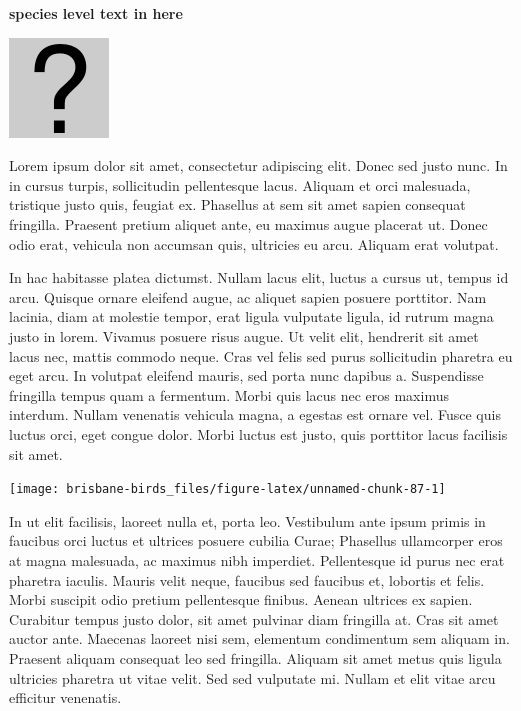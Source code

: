 \documentclass[]{book}
\let\origfigure\figure
\let\endorigfigure\endfigure
\renewenvironment{figure}[1][2] {
  \expandafter\origfigure\expandafter[H]
} {
  \endorigfigure
}
\begin{document}
\textbf{species level text in here}

\begin{figure}
\centering
\includegraphics{assets/missing.png}
\caption{No image for species}
\end{figure}

Lorem ipsum dolor sit amet, consectetur adipiscing elit. Donec sed justo
nunc. In in cursus turpis, sollicitudin pellentesque lacus. Aliquam et
orci malesuada, tristique justo quis, feugiat ex. Phasellus at sem sit
amet sapien consequat fringilla. Praesent pretium aliquet ante, eu
maximus augue placerat ut. Donec odio erat, vehicula non accumsan quis,
ultricies eu arcu. Aliquam erat volutpat.

In hac habitasse platea dictumst. Nullam lacus elit, luctus a cursus ut,
tempus id arcu. Quisque ornare eleifend augue, ac aliquet sapien posuere
porttitor. Nam lacinia, diam at molestie tempor, erat ligula vulputate
ligula, id rutrum magna justo in lorem. Vivamus posuere risus augue. Ut
velit elit, hendrerit sit amet lacus nec, mattis commodo neque. Cras vel
felis sed purus sollicitudin pharetra eu eget arcu. In volutpat eleifend
mauris, sed porta nunc dapibus a. Suspendisse fringilla tempus quam a
fermentum. Morbi quis lacus nec eros maximus interdum. Nullam venenatis
vehicula magna, a egestas est ornare vel. Fusce quis luctus orci, eget
congue dolor. Morbi luctus est justo, quis porttitor lacus facilisis sit
amet.

\begin{figure}
\texttt{[image: brisbane-birds\_files/figure-latex/unnamed-chunk-87-1]} \caption{insert figure caption}\label{fig:unnamed-chunk-87}
\end{figure}

In ut elit facilisis, laoreet nulla et, porta leo. Vestibulum ante ipsum
primis in faucibus orci luctus et ultrices posuere cubilia Curae;
Phasellus ullamcorper eros at magna malesuada, ac maximus nibh
imperdiet. Pellentesque id purus nec erat pharetra iaculis. Mauris velit
neque, faucibus sed faucibus et, lobortis et felis. Morbi suscipit odio
pretium pellentesque finibus. Aenean ultrices ex sapien. Curabitur
tempus justo dolor, sit amet pulvinar diam fringilla at. Cras sit amet
auctor ante. Maecenas laoreet nisi sem, elementum condimentum sem
aliquam in. Praesent aliquam consequat leo sed fringilla. Aliquam sit
amet metus quis ligula ultricies pharetra ut vitae velit. Sed sed
vulputate mi. Nullam et elit vitae arcu efficitur venenatis.
\end{document}
